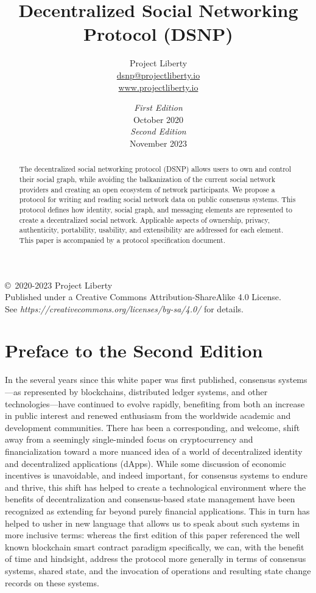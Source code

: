 \documentclass[12pt,letterpaper]{article}
\title{Decentralized Social Networking Protocol (DSNP)}
\author{
	Project Liberty\\
	\href{mailto:dsnp@projectliberty.io}{dsnp@projectliberty.io}\\
	\url{www.projectliberty.io}
}
\date{\textit{First Edition}\\
October 2020\\
\textit{Second Edition}\\
November 2023}
\begin{document}
\maketitle

\begin{abstract}
	The decentralized social networking protocol (DSNP) allows users to own and control
	their social graph, while avoiding the balkanization of the current social network
	providers and creating an open ecosystem of network participants. We propose a protocol
	for writing and reading social network data on public consensus systems.
	This protocol defines how identity, social graph, and messaging elements are represented
	to create a decentralized social network. Applicable aspects of ownership, privacy,
	authenticity, portability, usability, and extensibility are addressed for each element.
	This paper is accompanied by a protocol specification document.
\end{abstract}

\vfill
\copyright\, 2020-2023 Project Liberty\\
Published under a Creative Commons Attribution-ShareAlike 4.0 License.\\
See \textit{https://creativecommons.org/licenses/by-sa/4.0/} for details.

\thispagestyle{empty}
\clearpage

\raggedright

\section*{Preface to the Second Edition}

In the several years since this white paper was first published, consensus systems---as
represented by blockchains, distributed ledger systems, and other technologies---have
continued to evolve rapidly, benefiting from both an increase in public interest and renewed
enthusiasm from the worldwide academic and development communities. There has been a
corresponding, and welcome, shift away from a seemingly single-minded focus on
cryptocurrency and financialization toward a more nuanced idea of a world of decentralized
identity and decentralized applications (dApps). While some discussion of economic
incentives is unavoidable, and indeed important, for consensus systems to endure and thrive,
this shift has helped to create a technological environment where the benefits of
decentralization and consensus-based state management have been recognized as extending far
beyond purely financial applications. This in turn has helped to usher in new language that
allows us to speak about such systems in more inclusive terms: whereas the first edition of
this paper referenced the well known blockchain smart contract paradigm specifically, we
can, with the benefit of time and hindsight, address the protocol more generally in terms of
consensus systems, shared state, and the invocation of operations and resulting state change
records on these systems.
\end{document}
